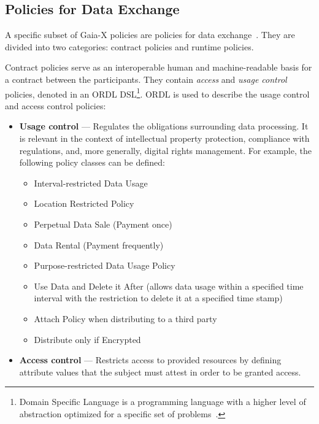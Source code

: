 \subsection{Policies for Data Exchange}\label{subsec:policies-for-data-exchange}

A specific subset of Gaia-X policies are policies for data exchange~\cite{gaiax_data_exchange_document}.
They are divided into two categories: contract policies and runtime policies.

Contract policies serve as an interoperable human and machine-readable basis for a contract between the participants.
They contain \textit{access} and \textit{usage control} policies, denoted in an ORDL DSL\footnote{Domain Specific Language is a programming language with a higher level of abstraction optimized for a specific set of problems~\cite{domain_specific_languages}.}.
ORDL is used to describe the usage control and access control policies:

\begin{itemize}
    \item \textbf{Usage control} --- Regulates the obligations surrounding data processing.
    It is relevant in the context of intellectual property protection, compliance with regulations, and, more generally, digital rights management.
    For example, the following policy classes can be defined:
    \begin{itemize}
        \item Interval-restricted Data Usage
        \item Location Restricted Policy
        \item Perpetual Data Sale (Payment once)
        \item Data Rental (Payment frequently)
        \item Purpose-restricted Data Usage Policy
        \item Use Data and Delete it After (allows data usage within a specified time interval with the restriction to delete it at a specified time stamp)
        \item Attach Policy when distributing to a third party
        \item Distribute only if Encrypted
    \end{itemize}
    \item \textbf{Access control} --- Restricts access to provided resources by defining attribute values that the subject must attest in order to be granted access.
\end{itemize}

